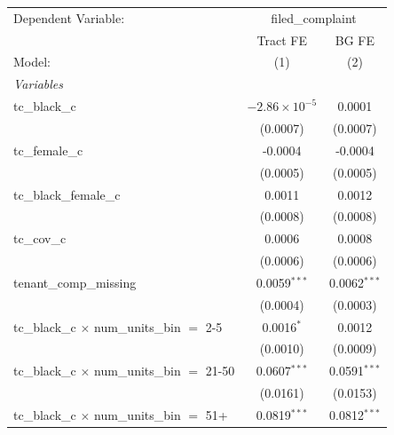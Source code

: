\begin{tabular}{lcc}
   \tabularnewline \midrule \midrule
   Dependent Variable: & \multicolumn{2}{c}{filed\_complaint}\\
                                                         & Tract FE                & BG FE \\   
   Model:                                                & (1)                     & (2)\\  
   \midrule
   \emph{Variables}\\
   tc\_black\_c                                          & $-2.86\times 10^{-5}$   & 0.0001\\   
                                                         & (0.0007)                & (0.0007)\\   
   tc\_female\_c                                         & -0.0004                 & -0.0004\\   
                                                         & (0.0005)                & (0.0005)\\   
   tc\_black\_female\_c                                  & 0.0011                  & 0.0012\\   
                                                         & (0.0008)                & (0.0008)\\   
   tc\_cov\_c                                            & 0.0006                  & 0.0008\\   
                                                         & (0.0006)                & (0.0006)\\   
   tenant\_comp\_missing                                 & 0.0059$^{***}$          & 0.0062$^{***}$\\   
                                                         & (0.0004)                & (0.0003)\\   
   tc\_black\_c $\times$ num\_units\_bin $=$ 2-5         & 0.0016$^{*}$            & 0.0012\\   
                                                         & (0.0010)                & (0.0009)\\   
   tc\_black\_c $\times$ num\_units\_bin $=$ 21-50       & 0.0607$^{***}$          & 0.0591$^{***}$\\   
                                                         & (0.0161)                & (0.0153)\\   
   tc\_black\_c $\times$ num\_units\_bin $=$ 51+         & 0.0819$^{***}$          & 0.0812$^{***}$\\   

\end{tabular}
